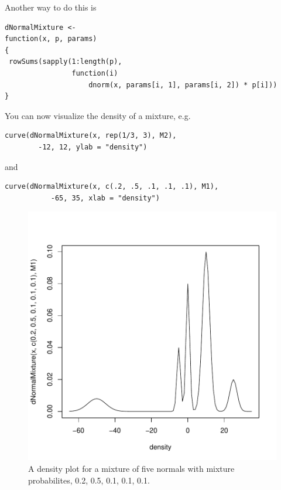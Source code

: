 Another way to do this is
\begin{verbatim}
dNormalMixture <-
function(x, p, params)
{
 rowSums(sapply(1:length(p),
                function(i)
                    dnorm(x, params[i, 1], params[i, 2]) * p[i]))
}
\end{verbatim}

You can now visualize the density of a mixture, e.g.
{\footnotesize{
\begin{verbatim}
curve(dNormalMixture(x, rep(1/3, 3), M2),
        -12, 12, ylab = "density")
\end{verbatim}
and
\begin{verbatim}
curve(dNormalMixture(x, c(.2, .5, .1, .1, .1), M1), 
           -65, 35, xlab = "density")
\end{verbatim}
}}


\begin{figure}[htbp]
\begin{center}
\leavevmode
\includegraphics{RNG/images/mixtureDensity.pdf}
\caption{A density plot for a mixture of five normals with mixture
  probabilites, 0.2, 0.5, 0.1, 0.1, 0.1.}
\label{fig:mix5NormDensity}
\end{center}
\end{figure}



